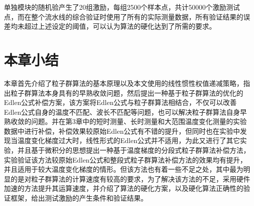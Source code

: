 单独模块的随机验产生了20组激励，每组2500个样本点，共计50000个激励测试点，而在整个流水线的综合验证时使用了所有的实际测量数据，所有验证结果的误差均未超过上述设定的阈值，可以认为算法的硬化达到了所需的要求。

\section{本章小结}
本章首先介绍了粒子群算法的基本原理以及本文使用的线性惯性权值递减策略，指出粒子群算法本身具有的早熟收敛问题，然后提出一种基于粒子群算法的优化的Edlen公式补偿方案，该方案将Edlen公式与粒子群算法相结合，不仅可以改善Edlen公式自身的温度不匹配、波长不匹配等问题，也可以解决粒子群算法自身早熟收敛的问题。并在第3章中的短时测量、长时测量和大范围温度变化测量的实验数据中进行补偿，补偿效果较原始Edlen公式有不错的提升，但同时也在实验中发现当温度变化梯度过大时，线性形式的Edlen公式并不适用，为此又进行了其它实验，并且基于微积分的思想提出一种基于温度梯度的分段式粒子群算法补偿方法，实验验证该方法较原始Edlen公式和整段式粒子群算法补偿方法的效果均有提升，并且适用于较大温度变化梯度的情形。但该方法也有着一些不足之处，其中最为明显的是对粒子群算法的计算速度有较高的要求，为了解决该方法的不足，采用硬件加速的方法提升其运算速度，并介绍了算法的硬化方案，以及硬化算法正确性的验证框架，给出测试激励的产生条件和验证结果。
